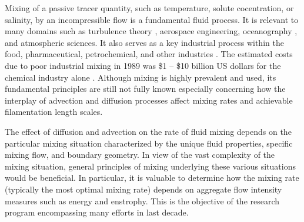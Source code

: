 \documentclass[12pt]{iopart}
\renewcommand{\vec}[1]{\mathbf{#1}}
\begin{document}



%
%
%


Mixing of a passive tracer quantity, such as temperature, solute cocentration, or salinity, by an incompressible flow is a fundamental fluid process. It is relevant to many domains such as turbulence theory \cite{Dimotakis2005,Violeau2000a}, aerospace engineering, oceanography \cite{Wunsch2004}, and atmospheric sciences. It also serves as a key industrial process within the food, pharmaceutical, petrochemical, and other industries \cite{paul2004handbook}. The estimated costs due to poor industrial mixing in 1989 was \$1 -- \$10 billion US dollars for the chemical industry alone \cite{paul2004handbook}. Although mixing is highly prevalent and used, its fundamental principles are still not fully known especially concerning how the interplay of advection and diffusion processes affect mixing rates and achievable filamentation length scales.

The effect of diffusion and advection on the rate of fluid mixing depends on the particular mixing situation characterized by the unique fluid properties, specific mixing flow, and boundary geometry. In view of the vast complexity of the mixing situation, general principles of mixing underlying these various situations would be beneficial. In particular, it is valuable to determine how the mixing rate (typically the most optimal mixing rate) depends on aggregate flow intensity measures such as energy and enstrophy. This is the objective of the research program encompassing many efforts \cite{CS2013,GI2014,JLT2012,JFM2011, Miles2017a,  JLT2012, DF2014, GM2005} in last decade. 
\end{document}
